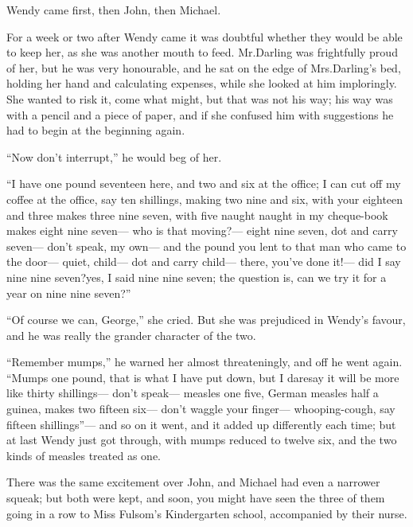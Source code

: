 Wendy came first, then John, then Michael.

For a week or two after Wendy came it was doubtful whether they would be able to keep her,
as she was another mouth to feed.
Mr.\@ Darling was frightfully proud of her, but he was very honourable,
and he sat on the edge of Mrs.\@ Darling’s bed, holding her hand and calculating expenses,
while she looked at him imploringly.
She wanted to risk it, come what might, but that was not his way;
his way was with a pencil and a piece of paper,
and if she confused him with suggestions he had to begin at the beginning again.

“Now don’t interrupt,” he would beg of her.

“I have one pound seventeen here, and two and six at the office;
I can cut off my coffee at the office, say ten shillings, making two nine and six,
with your eighteen and three makes three nine seven,
with five naught naught in my cheque-book makes eight nine seven—%
who is that moving?—%
eight nine seven, dot and carry seven—%
don’t speak, my own—%
and the pound you lent to that man who came to the door—%
quiet, child—%
dot and carry child—%
there, you’ve done it!—%
did I say nine nine seven?\@ yes, I said nine nine seven;
the question is, can we try it for a year on nine nine seven?”

“Of course we can, George,” she cried.
But she was prejudiced in Wendy’s favour, and he was really the grander character of the two.

“Remember mumps,” he warned her almost threateningly, and off he went again.
“Mumps one pound, that is what I have put down,
but I daresay it will be more like thirty shillings—%
don’t speak—%
measles one five, German measles half a guinea, makes two fifteen six—%
don’t waggle your finger—%
whooping-cough, say fifteen shillings”—%
and so on it went, and it added up differently each time;
but at last Wendy just got through,
with mumps reduced to twelve six, and the two kinds of measles treated as one.

There was the same excitement over John,
and Michael had even a narrower squeak;
but both were kept,
and soon, you might have seen the three of them going in a row to Miss Fulsom’s Kindergarten school,
accompanied by their nurse.

